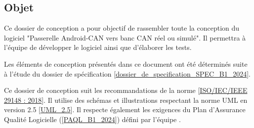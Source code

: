 \subsection{Objet} %
Ce dossier de conception a pour objectif de rassembler toute la conception du logiciel "Passerelle Android-CAN vers banc CAN réel ou simulé". Il permettra à l'équipe {\teamName} de développer le logiciel ainsi que d'élaborer les tests. 
\medskip

Les éléments de conception présentés dans ce document ont été déterminés suite à l'étude du dossier de spécification [\hyperref[SPEC]{dossier\_de\_specification\_SPEC\_B1\_2024}]. 
\medskip

Ce dossier de conception suit les recommandations de la norme [\hyperref[norme]{ISO/IEC/IEEE 29148 : 2018}]. Il utilise des schémas et illustrations respectant la norme UML en version 2.5 [\hyperref[uml_version]{UML\_2.5}]. Il respecte également les exigences du Plan d'Assurance Qualité Logicielle ([\hyperref[paql]{PAQL\_B1\_2024}]) défini par l'équipe {\teamName}. 
\medskip